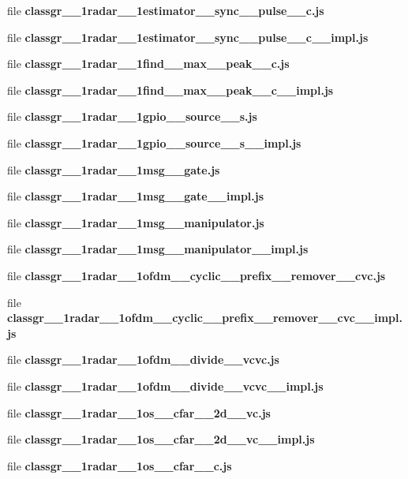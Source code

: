 \begin{DoxyCompactItemize}
\item 
file {\bf classgr\+\_\+\_\+1radar\+\_\+\_\+1estimator\+\_\+\+\_\+sync\+\_\+\+\_\+pulse\+\_\+\+\_\+c.\+js}
\item 
file {\bf classgr\+\_\+\_\+1radar\+\_\+\_\+1estimator\+\_\+\+\_\+sync\+\_\+\+\_\+pulse\+\_\+\+\_\+c\+\_\+\+\_\+impl.\+js}
\item 
file {\bf classgr\+\_\+\_\+1radar\+\_\+\_\+1find\+\_\+\+\_\+max\+\_\+\+\_\+peak\+\_\+\+\_\+c.\+js}
\item 
file {\bf classgr\+\_\+\_\+1radar\+\_\+\_\+1find\+\_\+\+\_\+max\+\_\+\+\_\+peak\+\_\+\+\_\+c\+\_\+\+\_\+impl.\+js}
\item 
file {\bf classgr\+\_\+\_\+1radar\+\_\+\_\+1gpio\+\_\+\+\_\+source\+\_\+\+\_\+s.\+js}
\item 
file {\bf classgr\+\_\+\_\+1radar\+\_\+\_\+1gpio\+\_\+\+\_\+source\+\_\+\+\_\+s\+\_\+\+\_\+impl.\+js}
\item 
file {\bf classgr\+\_\+\_\+1radar\+\_\+\_\+1msg\+\_\+\+\_\+gate.\+js}
\item 
file {\bf classgr\+\_\+\_\+1radar\+\_\+\_\+1msg\+\_\+\+\_\+gate\+\_\+\+\_\+impl.\+js}
\item 
file {\bf classgr\+\_\+\_\+1radar\+\_\+\_\+1msg\+\_\+\+\_\+manipulator.\+js}
\item 
file {\bf classgr\+\_\+\_\+1radar\+\_\+\_\+1msg\+\_\+\+\_\+manipulator\+\_\+\+\_\+impl.\+js}
\item 
file {\bf classgr\+\_\+\_\+1radar\+\_\+\_\+1ofdm\+\_\+\+\_\+cyclic\+\_\+\+\_\+prefix\+\_\+\+\_\+remover\+\_\+\+\_\+cvc.\+js}
\item 
file {\bf classgr\+\_\+\_\+1radar\+\_\+\_\+1ofdm\+\_\+\+\_\+cyclic\+\_\+\+\_\+prefix\+\_\+\+\_\+remover\+\_\+\+\_\+cvc\+\_\+\+\_\+impl.\+js}
\item 
file {\bf classgr\+\_\+\_\+1radar\+\_\+\_\+1ofdm\+\_\+\+\_\+divide\+\_\+\+\_\+vcvc.\+js}
\item 
file {\bf classgr\+\_\+\_\+1radar\+\_\+\_\+1ofdm\+\_\+\+\_\+divide\+\_\+\+\_\+vcvc\+\_\+\+\_\+impl.\+js}
\item 
file {\bf classgr\+\_\+\_\+1radar\+\_\+\_\+1os\+\_\+\+\_\+cfar\+\_\+\+\_\+2d\+\_\+\+\_\+vc.\+js}
\item 
file {\bf classgr\+\_\+\_\+1radar\+\_\+\_\+1os\+\_\+\+\_\+cfar\+\_\+\+\_\+2d\+\_\+\+\_\+vc\+\_\+\+\_\+impl.\+js}
\item 
file {\bf classgr\+\_\+\_\+1radar\+\_\+\_\+1os\+\_\+\+\_\+cfar\+\_\+\+\_\+c.\+js}

\end{DoxyCompactItemize}
